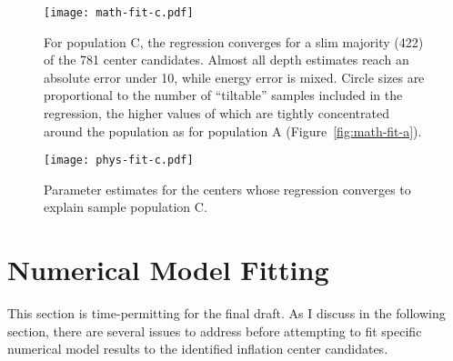\begin{figure}
    \texttt{[image: math-fit-c.pdf]}
    \caption[Population C: goodness of fit]{For population C, the regression converges for a slim majority (422) of the 781 center candidates. Almost all depth estimates reach an absolute error under 10, while energy error is mixed. Circle sizes are proportional to the number of ``tiltable'' samples included in the regression, the higher values of which are tightly concentrated around the population as for population A (Figure~\ref{fig:math-fit-a}).}%
    \label{fig:math-fit-c}
\end{figure}

\begin{figure}
    \texttt{[image: phys-fit-c.pdf]}%
    \caption[Population C: parameter estimates]{Parameter estimates for the centers whose regression converges to explain sample population C.}%
    \label{fig:phys-fit-c}
\end{figure}


\section{Numerical Model Fitting}

This section is time-permitting for the final draft. As I discuss in the following section, there are several issues to address before attempting to fit specific numerical model results to the identified inflation center candidates.